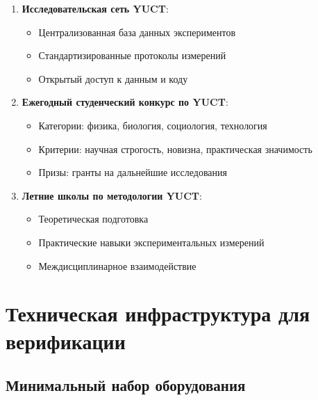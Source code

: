 \documentclass[12pt,a4paper]{article}
\begin{document}
	\begin{enumerate}
		\item \textbf{Исследовательская сеть YUCT}:
		\begin{itemize}
			\item Централизованная база данных экспериментов
			\item Стандартизированные протоколы измерений
			\item Открытый доступ к данным и коду
		\end{itemize}
		
		\item \textbf{Ежегодный студенческий конкурс по YUCT}:
		\begin{itemize}
			\item Категории: физика, биология, социология, технология
			\item Критерии: научная строгость, новизна, практическая значимость
			\item Призы: гранты на дальнейшие исследования
		\end{itemize}
		
		\item \textbf{Летние школы по методологии YUCT}:
		\begin{itemize}
			\item Теоретическая подготовка
			\item Практические навыки экспериментальных измерений
			\item Междисциплинарное взаимодействие
		\end{itemize}
	\end{enumerate}
	
	\section{Техническая инфраструктура для верификации}
	
	\subsection{Минимальный набор оборудования}
	
\end{document}
